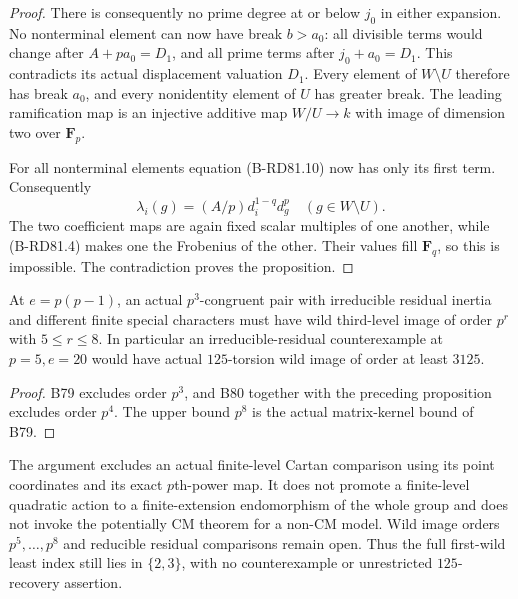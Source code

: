 \begin{proof}
There is consequently no prime degree at or below \(j_0\)
in either expansion. No nonterminal element can now have
break \(b>a_0\): all divisible terms would change after
\(A+pa_0=D_1\), and all prime terms after
\(j_0+a_0=D_1\). This contradicts its actual displacement
valuation \(D_1\). Every element of \(W\setminus U\)
therefore has break \(a_0\), and every nonidentity element
of \(U\) has greater break. The leading ramification map
is an injective additive map \(W/U\to k\) with image of
dimension two over \(\mathbf F_p\).

For all nonterminal elements equation (B-RD81.10) now has
only its first term. Consequently
\[
       \lambda_i(g)=(A/p)d_i^{1-q}d_g^p
                   \quad(g\in W\setminus U).          \tag{B-RD81.12}
\]
The two coefficient maps are again fixed scalar multiples
of one another, while (B-RD81.4) makes one the Frobenius
of the other. Their values fill \(\mathbf F_q\), so this
is impossible. The contradiction proves the proposition.
\end{proof}

\begin{corollary}
\label{cor:B-RD81}
At \(e=p(p-1)\), an actual \(p^3\)-congruent pair with
irreducible residual inertia and different finite special
characters must have wild third-level image of order \(p^r\)
with \(5\le r\le8\). In particular an irreducible-residual
counterexample at \(p=5,e=20\) would have actual
\(125\)-torsion wild image of order at least \(3125\).
\end{corollary}
\begin{proof}
B79 excludes order \(p^3\), and B80 together with the
preceding proposition excludes order \(p^4\). The upper
bound \(p^8\) is the actual matrix-kernel bound of B79.
\end{proof}

\begin{remark}
\label{rem:B-RD81-scope}
The argument excludes an actual finite-level Cartan comparison
using its point coordinates and its exact \(p\)th-power map.
It does not promote a finite-level quadratic action to a
finite-extension endomorphism of the whole group and does
not invoke the potentially CM theorem for a non-CM model.
Wild image orders \(p^5,\ldots,p^8\) and reducible residual
comparisons remain open. Thus the full first-wild least
index still lies in \(\{2,3\}\), with no counterexample or
unrestricted \(125\)-recovery assertion.
\end{remark}
